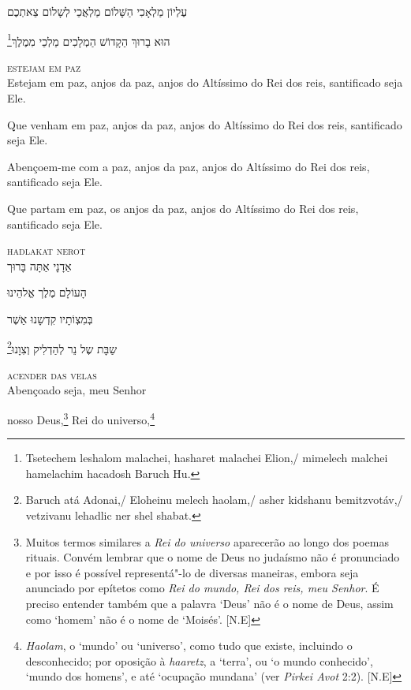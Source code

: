 עֶלְיוֹן מַלְאָכִי הַשָּׁלוֹם מַלְאֲכֵי לְשָלוֹם צֵאתְכֶם 

\footnote{Tsetechem leshalom malachei, hasharet malachei Elion,/
mimelech malchei hamelachim hacadosh Baruch Hu.}הוּא בָרוּךְ הַקָדוֹשׁ הַמְלָכִים מַלְכֵי מִמֶלֶךְ


\movetooddpage
\raggedright


\textsc{estejam em paz}\\[15pt]


Estejam em paz, anjos da paz, anjos do Altíssimo do Rei \qb{}dos reis,
santificado seja Ele.

Que venham em paz, anjos da paz, anjos do Altíssimo do \qb{}Rei dos reis,
santificado seja Ele.

Abençoem-me com a paz, anjos da paz, anjos do \qb{}Altíssimo do Rei dos reis,
santificado seja Ele.

Que partam em paz, os anjos da paz, anjos do Altíssimo \qb{}do Rei dos reis,
santificado seja Ele.

\movetoevenpage
\raggedleft



\textsc{hadlakat nerot}\\[15pt]

אַדָנָי אַתָּה בָּרוּך

הָעוֹלָם מֶלֶך אֱלהֵינוּ

בְּמִצְוֹתָיו קִדְשָנוּ אַשֶׁר

\footnote{Baruch atá Adonai,/ Eloheinu melech haolam,/ asher kidshanu bemitzvotáv,/ vetzivanu lehadlic ner shel shabat.}שַבָּת שֶל נֵר לְהַדְלִיק וְצִוָנוּ‏

\movetooddpage
\raggedright

\textsc{acender das velas}\\[15pt]

Abençoado seja, meu Senhor

nosso Deus,\footnote{
		Muitos termos similares a \textit{Rei do universo} aparecerão
		ao longo dos poemas rituais. Convém lembrar que o nome de Deus
		no judaísmo não é pronunciado e por isso é possível
		representá"-lo de diversas maneiras, embora seja anunciado por
		epítetos como \textit{Rei do mundo, Rei dos reis, meu Senhor}.
		É preciso entender também que a palavra `Deus' não é o nome de
		Deus, assim como `homem' não é o nome de `Moisés'. [N.E]} 
Rei do universo,\footnote{\textit{Haolam}, o `mundo' ou `universo', como tudo
		que existe, incluindo o desconhecido; por oposição à \textit{haaretz},
		a `terra', ou `o mundo conhecido', `mundo dos homens', e até `ocupação
		mundana' (ver \textit{Pirkei Avot} 2:2). [N.E]}

